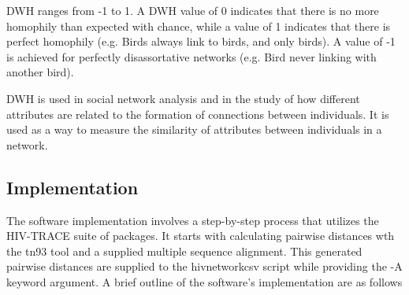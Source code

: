 \documentclass[utf8]{FrontiersinHarvard} %
\begin{document}
DWH ranges from -1 to 1. A DWH value of 0 indicates that there is no more homophily than expected with chance, while a value of 1
indicates that there is perfect homophily (e.g. Birds always link to birds, and only birds). A value of -1 is achieved for perfectly disassortative networks (e.g. Bird never linking with another bird).

DWH is used in social network analysis and in the study of how different
attributes are related to the formation of connections between individuals. It
is used as a way to measure the similarity of attributes between individuals in
a network.

\subsection{Implementation}

The software implementation involves a step-by-step process that utilizes the HIV-TRACE suite of packages. It starts with calculating pairwise distances wth the tn93 tool and a supplied multiple sequence alignment. 
This generated pairwise distances are supplied to the hivnetworkcsv script while providing the -A keyword argument. A brief outline of the software's implementation are as follows
\end{document}
